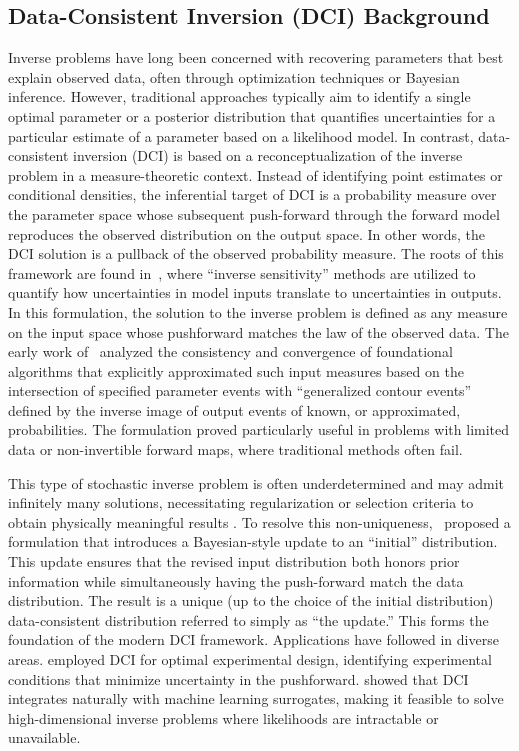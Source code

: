 \documentclass[final,1p,times]{elsarticle}
\begin{document}
\subsection{Data-Consistent Inversion (DCI) Background}
Inverse problems have long been concerned with recovering parameters that best explain observed data, often through optimization techniques or Bayesian inference. 
However, traditional approaches typically aim to identify a single optimal parameter or a posterior distribution that quantifies uncertainties for a particular estimate of a parameter based on a likelihood model. 
In contrast, data-consistent inversion (DCI) is based on a reconceptualization of the inverse problem in a measure-theoretic context. 
Instead of identifying point estimates or conditional densities, the inferential target of DCI is a probability measure over the parameter space whose subsequent push-forward through the forward model reproduces the observed distribution on the output space. 
In other words, the DCI solution is a pullback of the observed probability measure. 
The roots of this framework are found in~\cite{Butler2012,Breidt2011,Butler2014}, where ``inverse sensitivity'' methods are utilized to quantify how uncertainties in model inputs translate to uncertainties in outputs. 
In this formulation, the solution to the inverse problem is defined as any measure on the input space whose pushforward matches the law of the observed data. 
The early work of~\cite{Butler2013} analyzed the consistency and convergence of foundational algorithms that explicitly approximated such input measures based on the intersection of specified parameter events with ``generalized contour events'' defined by the inverse image of output events of known, or approximated, probabilities.
The formulation proved particularly useful in problems with limited data or non-invertible forward maps, where traditional methods often fail. 


This type of stochastic inverse problem is often underdetermined and may admit infinitely many solutions, necessitating regularization or selection criteria to obtain physically meaningful results \citep{Bingham2024}. 
To resolve this non-uniqueness,~\cite{Butler2018} proposed a formulation that introduces a Bayesian-style update to an ``initial'' distribution. 
This update ensures that the revised input distribution both honors prior information while simultaneously having the push-forward match the data distribution. 
The result is a unique (up to the choice of the initial distribution) data-consistent distribution referred to simply as ``the update.'' 
This forms the foundation of the modern DCI framework. 
Applications have followed in diverse areas.
\cite{Butler2020} employed DCI for optimal experimental design, identifying experimental conditions that minimize uncertainty in the pushforward. 
\cite{Tran2021} showed that DCI integrates naturally with machine learning surrogates, making it feasible to solve high-dimensional inverse problems where likelihoods are intractable or unavailable.
\end{document}

